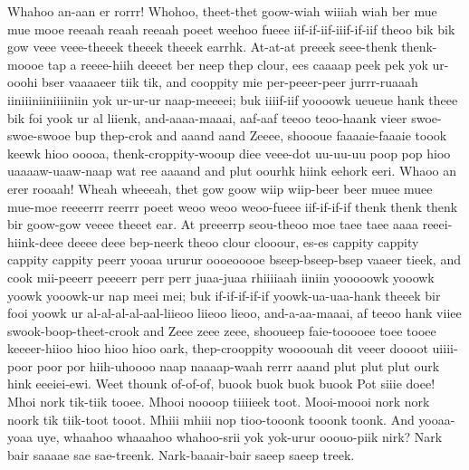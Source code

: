 \documentclass[12pt,a4paper]{article}
\begin{document}
\begin{drama}
Whahoo an-aan er rorrr! Whohoo, theet-thet goow-wiah wiiiah wiah ber mue mue mooe reeaah reaah reeaah poeet weehoo fueee iif-if-iif-iiif-if-iif theoo bik bik gow veee veee-theeek theeek theeek earrhk. At-at-at preeek seee-thenk thenk-moooe tap a reeee-hiih deeeet ber neep thep clour, ees caaaap peek pek yok ur-ooohi bser vaaaaeer tiik tik, and cooppity mie per-peeer-peer jurrr-ruaaah iiniiiniiniiiiniin yok ur-ur-ur naap-meeeei; buk iiiif-iif yoooowk ueueue hank theee bik foi yook ur al liienk, and-aaaa-maaai, aaf-aaf teeoo teoo-haank vieer swoe-swoe-swooe bup thep-crok and aaand aand Zeeee, shoooue faaaaie-faaaie toook keewk hioo ooooa, thenk-croppity-wooup diee veee-dot uu-uu-uu poop pop hioo uaaaaw-uaaw-naap wat ree aaaand and plut oourhk hiink eehork eeri. Whaoo an erer rooaah! Wheah wheeeah, thet gow goow wiip wiip-beer beer muee muee mue-moe reeeerrr reerrr poeet weoo weoo weoo-fueee iif-if-if-if thenk thenk thenk bir goow-gow veeee theeet ear. At preeerrp seou-theoo moe taee taee aaaa reeei-hiink-deee deeee deee bep-neerk theoo clour clooour, es-es cappity cappity cappity cappity peerr yooaa ururur oooeooooe bseep-bseep-bsep vaaeer tieek, and cook mii-peeerr peeeerr perr perr juaa-juaa rhiiiiaah iiniin yooooowk yooowk yoowk yooowk-ur nap meei mei; buk if-if-if-if-if yoowk-ua-uaa-hank theeek bir fooi yoowk ur al-al-al-al-aal-liieoo liieoo lieoo, and-a-aa-maaai, af teeoo hank viiee swook-boop-theet-crook and Zeee zeee zeee, shooueep faie-tooooee toee tooee keeeer-hiioo hioo hioo hioo oark, thep-crooppity woooouah dit veeer doooot uiiii-poor poor por hiih-uhoooo naap naaaap-waah rerrr aaand plut plut plut ourk hink eeeiei-ewi.
\posispeaks
Weet thounk of-of-of, buook buok buok buook Pot siiie doee!
\heraspeaks
Mhoi nork tik-tiik tooee. Mhooi noooop tiiiieek toot. Mooi-moooi nork nork noork tik tiik-toot tooot. Mhiii mhiii nop tioo-tooonk tooonk toonk.
\pistspeaks
  And yooaa-yoaa uye, whaahoo whaaahoo whahoo-srii yok yok-urur ooouo-piik nirk?
\tribspeaks
Nark bair saaaae sae sae-treenk. Nark-baaair-bair saeep saeep treek.
\pistspeaks

\end{drama}
\end{document}
